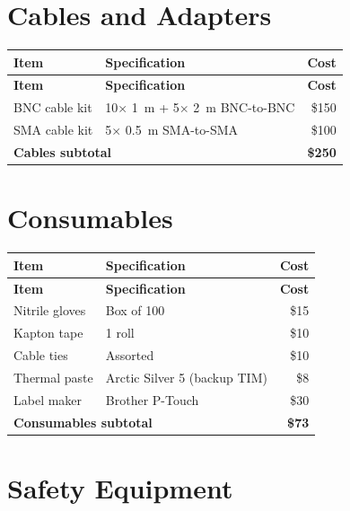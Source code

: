 \documentclass[11pt,a4paper,openany]{book}
\begin{document}
\section{Cables and Adapters}

\begin{center}
\begin{longtable}{p{5cm}lr}
\toprule
\textbf{Item} & \textbf{Specification} & \textbf{Cost} \\
\midrule
\endfirsthead
\toprule
\textbf{Item} & \textbf{Specification} & \textbf{Cost} \\
\midrule
\endhead
\bottomrule
\endfoot
\bottomrule
\endlastfoot
BNC cable kit & 10$\times$ 1~m + 5$\times$ 2~m BNC-to-BNC & \$150 \\
SMA cable kit & 5$\times$ 0.5~m SMA-to-SMA & \$100 \\
\midrule
\multicolumn{2}{l}{\textbf{Cables subtotal}} & \textbf{\$250} \\
\end{longtable}
\end{center}

\section{Consumables}

\begin{center}
\begin{longtable}{p{5cm}lr}
\toprule
\textbf{Item} & \textbf{Specification} & \textbf{Cost} \\
\midrule
\endfirsthead
\toprule
\textbf{Item} & \textbf{Specification} & \textbf{Cost} \\
\midrule
\endhead
\bottomrule
\endfoot
\bottomrule
\endlastfoot
Nitrile gloves & Box of 100 & \$15 \\
Kapton tape & 1 roll & \$10 \\
Cable ties & Assorted & \$10 \\
Thermal paste & Arctic Silver 5 (backup TIM) & \$8 \\
Label maker & Brother P-Touch & \$30 \\
\midrule
\multicolumn{2}{l}{\textbf{Consumables subtotal}} & \textbf{\$73} \\
\end{longtable}
\end{center}

\section{Safety Equipment}
\end{document}
